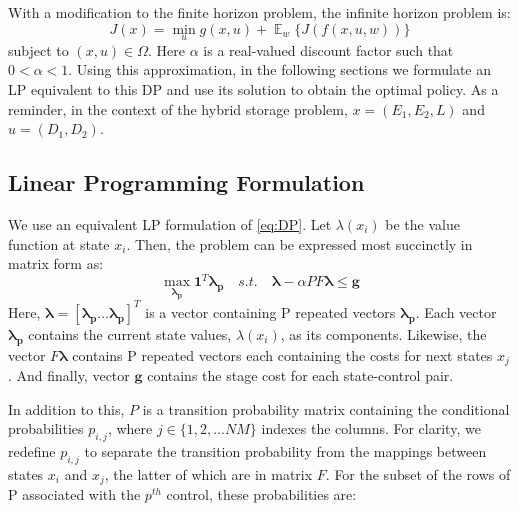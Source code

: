 \documentclass[conference]{IEEEtran}
\DeclareMathOperator{\E}{\mathbb{E}}
\begin{document}
With a modification to the finite horizon problem, the infinite horizon problem is:
\begin{displaymath} \label{eq:DP}
J(x)=\min_{u} g(x,u) + \mathop{\E}_{w} \{J(f(x,u,w))\}
\end{displaymath} subject to $(x,u)\in\Omega$. Here $\alpha$ is a real-valued discount factor such that $0<\alpha<1$. Using this approximation, in the following sections we formulate an LP equivalent to this DP and use its solution to obtain the optimal policy. As a reminder, in the context of the hybrid storage problem, $x=(E_{1},E_{2},L)$ and $u=(D_{1},D_{2})$.


\subsection{Linear Programming Formulation}
We use an equivalent LP formulation of \eqref{eq:DP}. Let $\lambda(x_{i})$ be the value function at state $x_{i}$. Then, the problem can be expressed most succinctly in matrix form as:
\begin{equation} \label{eq:prelimLPmtx}
    \max_{\boldsymbol{\lambda_{p}}} \boldsymbol{1}^{T} \boldsymbol{\lambda_{p}}
    \hspace{1em}s.t.\hspace{1em}
    \boldsymbol{\lambda}-\alpha PF\boldsymbol{\lambda} \leq \boldsymbol{g}
\end{equation} Here, $\boldsymbol{\lambda} = [\boldsymbol{\lambda_{p}}\hdots \boldsymbol{\lambda_{p}}]^{T}$ is a vector containing P repeated vectors $\boldsymbol{\lambda_{p}}$. Each vector $\boldsymbol{\lambda_{p}}$ contains the current state values, $\lambda(x_{i})$, as its components. Likewise, the vector $F\boldsymbol{\lambda}$ contains P repeated vectors each containing the costs for next states $x_{j}$. And finally, vector $\boldsymbol{g}$ contains the stage cost for each state-control pair. 

In addition to this, $P$ is a transition probability matrix containing the conditional probabilities $p_{i,j}$, where $j\in \{1,2,...NM\}$ indexes the columns. For clarity, we redefine $p_{i,j}$ to separate the transition probability from the mappings between states $x_{i}$ and $x_{j}$, the latter of which are in matrix $F$. For the subset of the rows of P associated with the $p^{th}$ control, these probabilities are:
\end{document}
